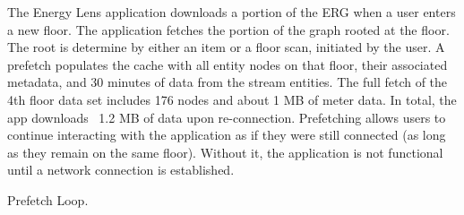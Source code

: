 The Energy Lens application downloads a portion of the ERG when a user enters a new floor.  The application fetches the portion
of the graph rooted at the floor.  The root is determine by either an item or a floor scan, initiated by the user.
A prefetch populates the cache with all entity nodes on that floor, their associated metadata,
and 30 minutes of data from the stream entities.  The full fetch of the 4th floor data set includes
176 nodes and about 1 MB of meter data.  In total, the app downloads ~1.2 MB of data upon re-connection.
Prefetching allows users to continue interacting with the application as if they were still connected (as long as they remain on
the same floor).  Without it, the application is not functional until a network connection is established.


\begin{algorithm}[h!]
 \SetAlgoLined
 \caption{Prefetch Loop.}
 \label{alg:prefetch}
\end{algorithm}


